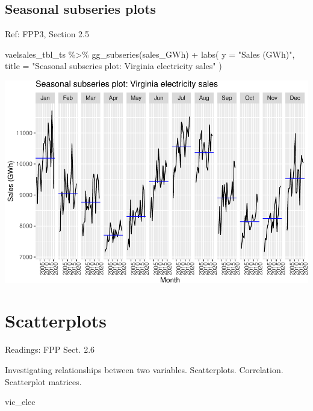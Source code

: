 \documentclass[
]{book}
\newenvironment{Shaded}{\begin{snugshade}}{\end{snugshade}}
\newcommand{\AttributeTok}[1]{\textcolor[rgb]{0.77,0.63,0.00}{#1}}
\newcommand{\FunctionTok}[1]{\textcolor[rgb]{0.00,0.00,0.00}{#1}}
\newcommand{\NormalTok}[1]{#1}
\newcommand{\SpecialCharTok}[1]{\textcolor[rgb]{0.00,0.00,0.00}{#1}}
\newcommand{\StringTok}[1]{\textcolor[rgb]{0.31,0.60,0.02}{#1}}
\begin{document}
\hypertarget{seasonal-subseries-plots}{%
\subsection{Seasonal subseries plots}\label{seasonal-subseries-plots}}

Ref: FPP3, Section 2.5

\begin{Shaded}
\begin{Highlighting}[]
\NormalTok{vaelsales\_tbl\_ts }\SpecialCharTok{\%\textgreater{}\%}
  \FunctionTok{gg\_subseries}\NormalTok{(sales\_GWh) }\SpecialCharTok{+}
  \FunctionTok{labs}\NormalTok{(}
    \AttributeTok{y =} \StringTok{"Sales (GWh)"}\NormalTok{,}
    \AttributeTok{title =} \StringTok{"Seasonal subseries plot: Virginia electricity sales"}
\NormalTok{  )}
\end{Highlighting}
\end{Shaded}

\includegraphics{graphics/unnamed-chunk-17-1.pdf}

\hypertarget{scatterplots}{%
\section{Scatterplots}\label{scatterplots}}

Readings: FPP Sect. 2.6

Investigating relationships between two variables. Scatterplots. Correlation. Scatterplot matrices.

\begin{Shaded}
\begin{Highlighting}[]
\NormalTok{vic\_elec}
\end{Highlighting}
\end{Shaded}
\end{document}
